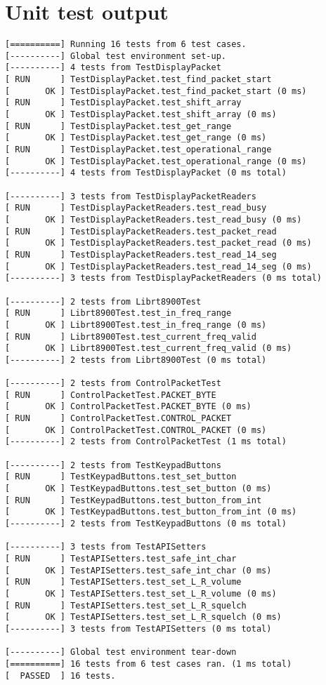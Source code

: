 \section{Unit test output}
\label{unit_test_output}
\begin{verbatim}
[==========] Running 16 tests from 6 test cases.
[----------] Global test environment set-up.
[----------] 4 tests from TestDisplayPacket
[ RUN      ] TestDisplayPacket.test_find_packet_start
[       OK ] TestDisplayPacket.test_find_packet_start (0 ms)
[ RUN      ] TestDisplayPacket.test_shift_array
[       OK ] TestDisplayPacket.test_shift_array (0 ms)
[ RUN      ] TestDisplayPacket.test_get_range
[       OK ] TestDisplayPacket.test_get_range (0 ms)
[ RUN      ] TestDisplayPacket.test_operational_range
[       OK ] TestDisplayPacket.test_operational_range (0 ms)
[----------] 4 tests from TestDisplayPacket (0 ms total)

[----------] 3 tests from TestDisplayPacketReaders
[ RUN      ] TestDisplayPacketReaders.test_read_busy
[       OK ] TestDisplayPacketReaders.test_read_busy (0 ms)
[ RUN      ] TestDisplayPacketReaders.test_packet_read
[       OK ] TestDisplayPacketReaders.test_packet_read (0 ms)
[ RUN      ] TestDisplayPacketReaders.test_read_14_seg
[       OK ] TestDisplayPacketReaders.test_read_14_seg (0 ms)
[----------] 3 tests from TestDisplayPacketReaders (0 ms total)

[----------] 2 tests from Librt8900Test
[ RUN      ] Librt8900Test.test_in_freq_range
[       OK ] Librt8900Test.test_in_freq_range (0 ms)
[ RUN      ] Librt8900Test.test_current_freq_valid
[       OK ] Librt8900Test.test_current_freq_valid (0 ms)
[----------] 2 tests from Librt8900Test (0 ms total)

[----------] 2 tests from ControlPacketTest
[ RUN      ] ControlPacketTest.PACKET_BYTE
[       OK ] ControlPacketTest.PACKET_BYTE (0 ms)
[ RUN      ] ControlPacketTest.CONTROL_PACKET
[       OK ] ControlPacketTest.CONTROL_PACKET (0 ms)
[----------] 2 tests from ControlPacketTest (1 ms total)

[----------] 2 tests from TestKeypadButtons
[ RUN      ] TestKeypadButtons.test_set_button
[       OK ] TestKeypadButtons.test_set_button (0 ms)
[ RUN      ] TestKeypadButtons.test_button_from_int
[       OK ] TestKeypadButtons.test_button_from_int (0 ms)
[----------] 2 tests from TestKeypadButtons (0 ms total)

[----------] 3 tests from TestAPISetters
[ RUN      ] TestAPISetters.test_safe_int_char
[       OK ] TestAPISetters.test_safe_int_char (0 ms)
[ RUN      ] TestAPISetters.test_set_L_R_volume
[       OK ] TestAPISetters.test_set_L_R_volume (0 ms)
[ RUN      ] TestAPISetters.test_set_L_R_squelch
[       OK ] TestAPISetters.test_set_L_R_squelch (0 ms)
[----------] 3 tests from TestAPISetters (0 ms total)

[----------] Global test environment tear-down
[==========] 16 tests from 6 test cases ran. (1 ms total)
[  PASSED  ] 16 tests.
\end{verbatim}